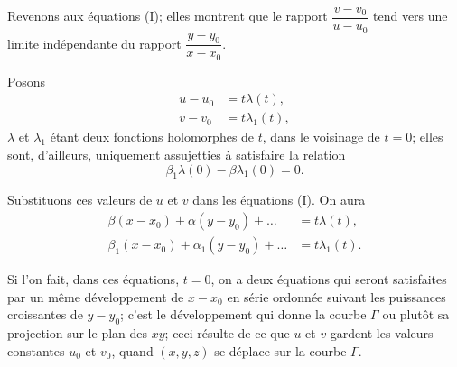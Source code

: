 \documentclass{article}
\begin{document}
Revenons aux équations (I); elles montrent que le rapport $\dfrac{v - v_{0}}{u - u_{0}}$ tend vers une limite indépendante du rapport $\dfrac{y - y_{0}}{x - x_{0}}$.

Posons
\[
\begin{aligned}
u - u_{0} &= t\lambda(t), \\
v - v_{0} &= t\lambda_{1}(t),
\end{aligned}
\]
$\lambda$ et $\lambda_{1}$ étant deux fonctions holomorphes de $t$, dans le voisinage de $t = 0$; elles sont, d'ailleurs, uniquement assujetties à satisfaire la relation
\[
\beta_{1}\lambda(0) - \beta\lambda_{1}(0) = 0.
\]

Substituons ces valeurs de $u$ et $v$ dans les équations (I). On aura
\[
\begin{aligned}
\beta(x - x_{0}) + \alpha(y - y_{0}) + \ldots &= t\lambda(t), \\
\beta_{1}(x - x_{0}) + \alpha_{1}(y - y_{0}) + \ldots &= t\lambda_{1}(t).
\end{aligned}
\tag{II}
\]

Si l'on fait, dans ces équations, $t = 0$, on a deux équations qui seront satisfaites par un même développement de $x - x_{0}$ en série ordonnée suivant les puissances croissantes de $y - y_{0}$; c'est le développement qui donne la courbe $\Gamma$ ou plutôt sa projection sur le plan des $xy$; ceci résulte de ce que $u$ et $v$ gardent les valeurs constantes $u_{0}$ et $v_{0}$, quand $(x, y, z)$ se déplace sur la courbe $\Gamma$.
\end{document}
